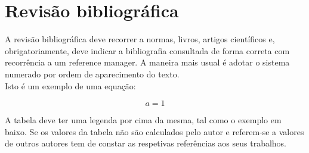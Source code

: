 \chapter{Revisão bibliográfica}

A revisão bibliográfica deve recorrer a normas, livros, artigos científicos e, obrigatoriamente, deve indicar a bibliografia consultada de forma correta com recorrência a um reference manager. A maneira mais usual é adotar o sistema numerado por ordem de aparecimento do texto.\\
Isto é um exemplo de uma equação:

\begin{equation}
\label{eq:eq1}
    a = 1
\end{equation}

A tabela deve ter uma legenda por cima da mesma, tal como o exemplo em baixo. Se os valores da tabela não são calculados pelo autor e referem-se a valores de outros autores tem de constar as respetivas referências aos seus trabalhos.



